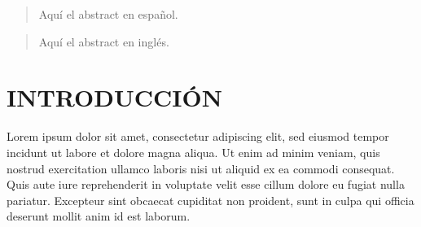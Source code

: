 \documentclass[12pt,a4paper,twoside]{article} %
\begin{document}
\begin{abstract}
	Aquí el abstract en español.
\end{abstract}

\pagebreak

\thispagestyle{empty}
\begin{abstract}
	Aquí el abstract en inglés.
\end{abstract}
	
\pagebreak
{}
\setcounter{page}{1}
\tableofcontents
\newpage
\listoftables
\newpage
\listoffigures
\newpage


\setcounter{page}{1}

\section{INTRODUCCIÓN}
\label{sec:introduccion}

Lorem ipsum dolor sit amet, consectetur adipiscing elit, sed eiusmod tempor incidunt ut labore et dolore magna aliqua. Ut enim ad minim veniam, quis nostrud exercitation ullamco laboris nisi ut aliquid ex ea commodi consequat. Quis aute iure reprehenderit in voluptate velit esse cillum dolore eu fugiat nulla pariatur. Excepteur sint obcaecat cupiditat non proident, sunt in culpa qui officia deserunt mollit anim id est laborum.
\end{document}
